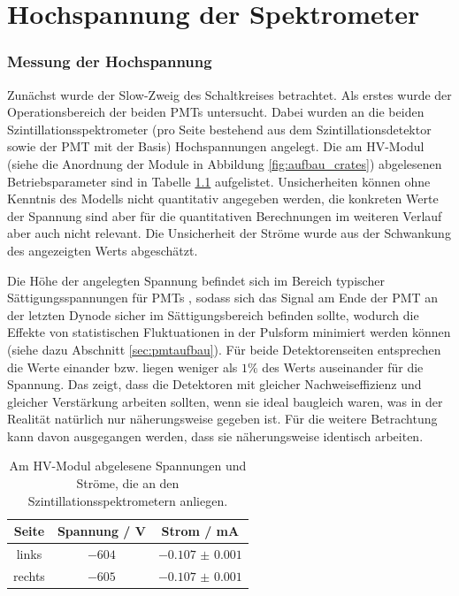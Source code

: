 \chapter{Hochspannung der Spektrometer}



\subsection{Messung der Hochspannung}

Zunächst wurde der Slow-Zweig des Schaltkreises betrachtet. Als erstes wurde der Operationsbereich der beiden PMTs untersucht.
Dabei wurden an die beiden Szintillationsspektrometer (pro Seite bestehend aus dem Szintillationsdetektor sowie der PMT mit der Basis) Hochspannungen angelegt. Die am HV-Modul (siehe die Anordnung der Module in Abbildung \ref{fig:aufbau_crates}) abgelesenen Betriebsparameter sind in Tabelle \ref{tab:versorgungsspannung} aufgelistet. Unsicherheiten können ohne Kenntnis des Modells nicht quantitativ angegeben werden, die konkreten Werte der Spannung sind aber für die quantitativen Berechnungen im weiteren Verlauf aber auch nicht relevant. Die Unsicherheit der Ströme wurde aus der Schwankung des angezeigten Werts abgeschätzt.


Die Höhe der angelegten Spannung befindet sich im Bereich typischer Sättigungsspannungen für PMTs \cite[188]{leotechniques}, sodass sich das Signal am Ende der PMT an der letzten Dynode sicher im Sättigungsbereich befinden sollte, wodurch die Effekte von statistischen Fluktuationen in der Pulsform minimiert werden können (siehe dazu Abschnitt \ref{sec:pmtaufbau}).
Für beide Detektorenseiten entsprechen die Werte einander bzw. liegen weniger als $1\%$ des Werts auseinander für die Spannung. Das zeigt, dass die Detektoren mit gleicher Nachweiseffizienz und gleicher Verstärkung arbeiten sollten, wenn sie ideal baugleich waren, was in der Realität natürlich nur näherungsweise gegeben ist. Für die weitere Betrachtung kann davon ausgegangen werden, dass sie näherungsweise identisch arbeiten.

\begin{table}[h]
	    \centering
	    \begin{tabular}{|c|c|c|} \hline
		Seite & Spannung / V & Strom / mA \\
		\hline
		links & $\num{-604}$ & $\num{-0.107(1)}$ \\
		rechts & $\num{-605}$ & $\num{-0.107(1)}$ \\ \hline
		\end{tabular}
	    \caption{Am HV-Modul abgelesene Spannungen und Ströme, die an den Szintillationsspektrometern anliegen.}
	    \label{tab:versorgungsspannung}
	\end{table}
